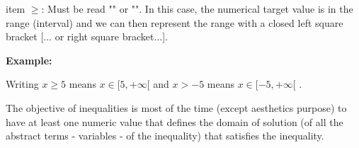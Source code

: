 \begin{itemize}
	item $\geq$: Must be read "" or "". In this case, the numerical target value is in the range (interval) and we can then represent the range  with a closed left square bracket [... or right square bracket...].
	\begin{tcolorbox}[colframe=black,colback=white,sharp corners]
\textbf{{\Large {}}Example:}\\
	\begin{flushleft}
	Writing $x\geq 5$ means $x \in [5,+\infty[$ and $x>-5$ means $x \in [-5,+\infty[$ .
	\end{flushleft}
	\end{tcolorbox}
	\end{itemize}
	The objective of inequalities is most of the time (except aesthetics purpose) to have at least one numeric value that defines the domain of solution (of all the abstract terms - variables - of the inequality) that satisfies the inequality.
	
